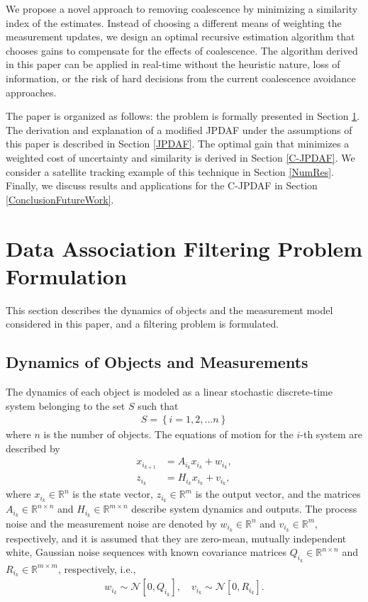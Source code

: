 \documentclass[letterpaper, 10pt, conference]{ieeeconf}
\renewcommand{\Re}{\ensuremath{\mathbb{R}}}
\begin{document}
We propose a novel approach to removing coalescence by minimizing a similarity index of the estimates.
Instead of choosing a different means of weighting the measurement updates, we design an optimal recursive estimation algorithm that chooses gains to compensate for the effects of coalescence.
The algorithm derived in this paper can be applied in real-time without the heuristic nature, loss of information, or the risk of hard decisions from the current coalescence avoidance approaches.

The paper is organized as follows: the problem is formally presented in Section \ref{ProbDef}.
The derivation and explanation of a modified JPDAF under the assumptions of this paper is described in Section \ref{JPDAF}.
The optimal gain that minimizes a weighted cost of uncertainty and similarity is derived in Section \ref{C-JPDAF}.
We consider a satellite tracking example of this technique in Section \ref{NumRes}.
Finally, we discuss results and applications for the C-JPDAF in Section \ref{ConclusionFutureWork}.

\section{Data Association Filtering Problem Formulation}
\label{ProbDef}

This section describes the dynamics of objects and the measurement model considered in this paper, and a filtering problem is formulated. 

\subsection{Dynamics of Objects and Measurements}

The dynamics of each object is modeled as a linear stochastic discrete-time system belonging to the set $S$ such that
\begin{align}
S=\left\{i=1,2,...n\right\}
\end{align}
where $n$ is the number of objects.
The equations of motion for the $i$-th system are described by
\begin{align}
x_{i_{k+1}} & = A_{i_k} x_{i_k} + w_{i_k},\label{eqn:xkp}\\
z_{i_k} & = H_{i_k} x_{i_k} + v_{i_k},
\end{align}
where $x_{i_k}\in\Re^n$ is the state vector, $z_{i_k}\in\Re^m$ is the output vector, and  the matrices $A_{i_k}\in\Re^{n\times n}$ and $H_{i_k}\in\Re^{m\times n}$ describe system dynamics and outputs. The process noise and the measurement noise are denoted by $w_{i_k}\in\Re^n$ and $v_{i_k}\in\Re^m$, respectively, and it is assumed that they are zero-mean, mutually independent white, Gaussian noise sequences with known covariance matrices $Q_{i_k}\in\Re^{n\times n}$ and $R_{i_k}\in\Re^{m\times m}$, respectively, i.e.,
\begin{align}
w_{i_k} \sim \mathcal{N}[0,Q_{i_k}],\quad
v_{i_k} \sim \mathcal{N}[0,R_{i_k}].
\end{align}
\end{document}
